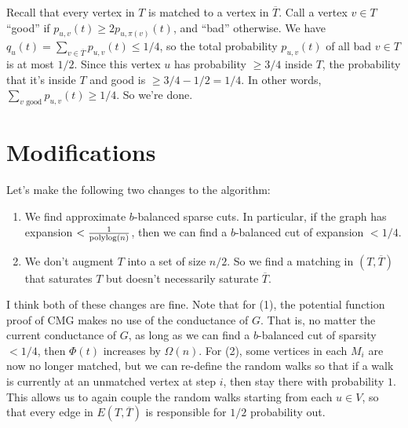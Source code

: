 \documentclass{article}
\begin{document}
Recall that every vertex in $T$ is matched to a vertex in $\overline T$. Call a vertex $v\in T$ ``good'' if $p_{u,v}(t) \ge 2p_{u,\pi(v)}(t)$, and ``bad'' otherwise. We have $q_u(t) =\sum_{v\in\overline T}p_{u,v}(t) \le 1/4$, so the total probability $p_{u,v}(t)$ of all bad $v\in T$ is at most $1/2$. Since this vertex $u$ has probability $\ge3/4$ inside $T$, the probability that it's inside $T$ and good is $\ge 3/4 - 1/2 = 1/4$. In other words, $\sum_{v\text{ good}}p_{u,v}(t)\ge1/4$. So we're done.

\section{Modifications}

Let's make the following two changes to the algorithm:
\begin{enumerate}
\item We find approximate $b$-balanced sparse cuts. In particular, if the graph has expansion $< \frac1{\textup{polylog}(n)}$, then we can find a $b$-balanced cut of expansion $<1/4$.
\item We don't augment $T$ into a set of size $n/2$. So we find a matching in $(T,\overline T)$ that saturates $T$ but doesn't necessarily saturate $\overline T$.
\end{enumerate}

I think both of these changes are fine. Note that for (1), the potential function proof of CMG makes no use of the conductance of $G$. That is, no matter the current conductance of $G$, as long as we can find a $b$-balanced cut of sparsity $<1/4$, then $\Phi(t)$ increases by $\Omega(n)$. For (2), some vertices in each $M_i$ are now no longer matched, but we can re-define the random walks so that if a walk is currently at an unmatched vertex at step $i$, then stay there with probability $1$. This allows us to again couple the random walks starting from each $u\in V$, so that every edge in $E(T,\overline T)$ is responsible for $1/2$ probability out.
\end{document}
